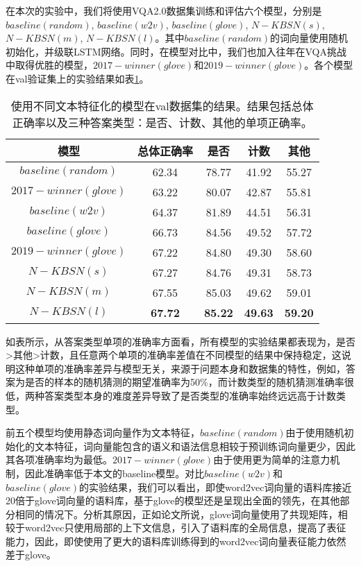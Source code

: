 在本次的实验中，我们将使用VQA2.0数据集训练和评估六个模型，分别是$baseline(random)$, $baseline(w2v)$, $baseline(glove)$, $N-KBSN(s)$, $N-KBSN(m)$, $N-KBSN(l)$。其中$baseline(random)$的词向量使用随机初始化，并级联LSTM网络。同时，在模型对比中，我们也加入往年在VQA挑战中取得优胜的模型，$2017-winner(glove)$和$2019-winner(glove)$。各个模型在val验证集上的实验结果如表\ref{5mresults}。
\begin{table}[H]
\centering
\caption{使用不同文本特征化的模型在val数据集的结果。结果包括总体正确率以及三种答案类型：是否、计数、其他的单项正确率。}
\begin{tabular}{c|cccc}
\toprule
模型 & 总体正确率 & 是否 & 计数 & 其他\\
\midrule
$baseline(random)$& 62.34 &  78.77 & 41.92 & 55.27\\
$2017-winner(glove)$ & 63.22 & 80.07 & 42.87 & 55.81\\
$baseline(w2v)$&  64.37 &  81.89 &  44.51 & 56.31\\
$baseline(glove)$&  66.73 & 84.56 &  49.52 & 57.72\\
$2019-winner(glove)$& 67.22 & 84.80 & 49.30 & 58.60\\
\midrule
$N-KBSN(s)$&  67.27& 84.76&  49.31& 58.73\\
$N-KBSN(m)$&  67.55& 85.03&  49.62& 59.01\\
$N-KBSN(l)$&  \textbf{67.72}& \textbf{85.22}&  \textbf{49.63}& \textbf{59.20}\\
\bottomrule
\end{tabular}
\label{5mresults}
\end{table}

如表所示，从答案类型单项的准确率方面看，所有模型的实验结果都表现为，是否>其他>计数，且任意两个单项的准确率差值在不同模型的结果中保持稳定，这说明这种单项的准确率差异与模型无关，来源于问题本身和数据集的特性，例如，答案为是否的样本的随机猜测的期望准确率为50\%，而计数类型的随机猜测准确率很低，两种答案类型本身的难度差异导致了是否类型的准确率始终远远高于计数类型。

前五个模型均使用静态词向量作为文本特征，$baseline(random)$由于使用随机初始化的文本特征，词向量能包含的语义和语法信息相较于预训练词向量更少，因此其各项准确率均为最低。$2017-winner(glove)$由于使用更为简单的注意力机制，因此准确率低于本文的baseline模型。对比$baseline(w2v)$和$baseline(glove)$的实验结果，我们可以看出，即使word2vec词向量的语料库接近20倍于glove词向量的语料库，基于glove的模型还是呈现出全面的领先，在其他部分相同的情况下。分析其原因，正如论文\cite{pennington2014glove}所说，glove词向量使用了共现矩阵，相较于word2vec只使用局部的上下文信息，引入了语料库的全局信息，提高了表征能力，因此，即使使用了更大的语料库训练得到的word2vec词向量表征能力依然差于glove。


